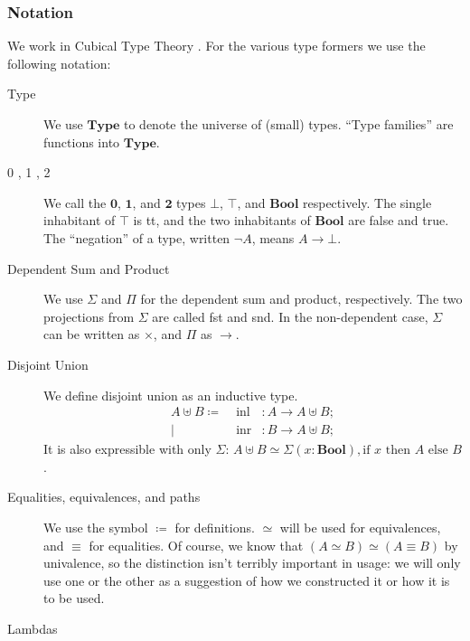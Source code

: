 \subsubsection{Notation}
We work in Cubical Type Theory \cite{cohenCubicalTypeTheory2016}.
For the various type formers we use the following notation:
\begin{description}
  \item[Type] We use \(\mathbf{Type}\) to denote the universe of (small) types.
    ``Type families'' are functions into \(\mathbf{Type}\).
  \item[0 , 1 , 2] We call the \(\mathbf{0}\), \(\mathbf{1}\), and
    \(\mathbf{2}\) types \(\bot\), \(\top\), and \(\mathbf{Bool}\) respectively.
    The single inhabitant of \(\top\) is tt, and the two inhabitants of
    \(\mathbf{Bool}\) are false and true.
    The ``negation'' of a type, written \(\neg A\), means \(A \rightarrow
    \bot\).
  \item[Dependent Sum and Product] We use \(\Sigma\) and \(\Pi\) for the
    dependent sum and product, respectively.
    The two projections from \(\Sigma\) are called fst and snd.
    In the non-dependent case, \(\Sigma\) can be written as \(\times\), and
    \(\Pi\) as \(\rightarrow\).
  \item[Disjoint Union] We define disjoint union as an inductive type.
    \begin{equation}
      \begin{alignedat}{3}
        A \uplus B \coloneqq & \;
        \text{inl} &: A \rightarrow A \uplus B ; \\
        | & \;  \text{inr} &: B \rightarrow A \uplus B ;
      \end{alignedat}
    \end{equation}
    It is also expressible with only \(\Sigma\):
    \(A \uplus B \simeq \Sigma(x : \mathbf{Bool}) , \text{if } x \text{ then
    } A \text{ else } B \).
  \item[Equalities, equivalences, and paths] We use the symbol \(\coloneqq\)
    for definitions.
    \(\simeq\) will be used for equivalences, and \(\equiv\) for equalities.
    Of course, we know that \((A \simeq B) \simeq (A \equiv B)\) by univalence,
    so the distinction isn't terribly important in usage: we will only use one
    or the other as a suggestion of how we constructed it or how it is to be
    used.
  \item[Lambdas] 
\end{description}
